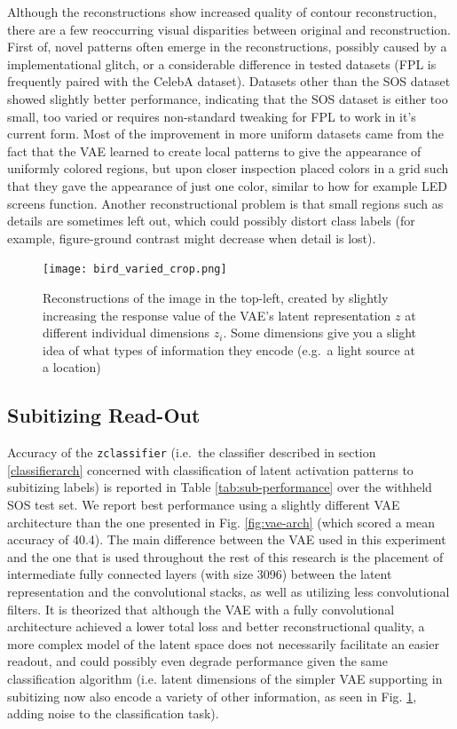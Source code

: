 \documentclass[twocolumn]{article}
\begin{document}
Although the reconstructions show increased quality of contour
reconstruction, there are a few reoccurring visual disparities between
original and reconstruction. First of, novel patterns often emerge in
the reconstructions, possibly caused by a implementational glitch, or a
considerable difference in tested datasets (FPL is frequently paired
with the CelebA \citet{liu2015deep} dataset). Datasets other than the
SOS dataset showed slightly better performance, indicating that the SOS
dataset is either too small, too varied or requires non-standard tweaking
for FPL to work in it's current form. Most of the improvement in more
uniform datasets came from the fact that the VAE learned to create 
local patterns to give the appearance of uniformly colored regions, but
upon closer inspection placed colors in a grid such that they
gave the appearance of just one color, similar to how for example LED
screens function. Another reconstructional problem is that small regions such as details are sometimes left out, which
could possibly distort class labels (for example, figure-ground contrast might decrease when detail is lost).

\begin{figure}
\centering
\texttt{[image: bird\_varied\_crop.png]}
\caption{Reconstructions of the image in the top-left, created by slightly
increasing the response value of the VAE's latent representation \(z\) at different individual dimensions \(z_i\). Some dimensions give
you a slight idea of what types of information they encode (e.g.~a light source at a
location)}
\label{fig:latent}
\end{figure}

\hypertarget{subitizing-read-out}{%
\subsection{Subitizing Read-Out}\label{subitizing-read-out}}

Accuracy of the \texttt{zclassifier} (i.e.~the classifier described
in section \ref{classifierarch} concerned
with classification of latent activation patterns to subitizing labels)
is reported in Table \ref{tab:sub-performance} over the withheld SOS test set. We report best performance using a slightly different VAE architecture than the one presented in
Fig. \ref{fig:vae-arch} (which scored a mean accuracy of 40.4).
The main difference between the VAE used in this experiment and the one
that is used throughout the rest of this research is the placement of
intermediate fully connected layers (with size 3096) between the latent
representation and the convolutional stacks, as well as utilizing less convolutional filters. It is theorized that although the VAE with a fully convolutional architecture achieved a lower total loss and better reconstructional quality, a more complex model of the latent space does not necessarily facilitate an easier readout, and could possibly even degrade performance given the same classification algorithm (i.e. latent dimensions of the simpler VAE supporting in subitizing now also encode a variety of other information, as seen in Fig. \ref{fig:latent}, adding noise to the classification task). 
\end{document}
